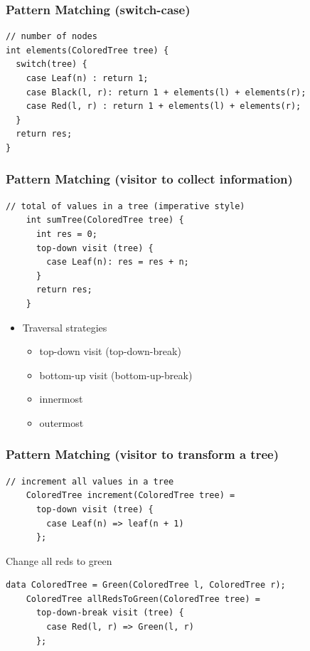 \documentclass{beamer}
\begin{document}
\begin{frame}[fragile]
  \frametitle{Pattern Matching (switch-case)}

    \begin{small}
      \begin{lstlisting}[language=Rascal]
// number of nodes  
int elements(ColoredTree tree) {
  switch(tree) {
    case Leaf(n) : return 1; 
    case Black(l, r): return 1 + elements(l) + elements(r);
    case Red(l, r) : return 1 + elements(l) + elements(r);
  }
  return res; 
} 
\end{lstlisting}
    \end{small}

  
\end{frame}

\begin{frame}[fragile]
  \frametitle{Pattern Matching (visitor to collect information)}

    \begin{small}
      \begin{lstlisting}[language=Rascal]
    // total of values in a tree (imperative style)     
    int sumTree(ColoredTree tree) {
      int res = 0;
      top-down visit (tree) {
        case Leaf(n): res = res + n;
      }
      return res;
    }
\end{lstlisting}
\end{small}

  \begin{itemize}
    \item Traversal strategies
      \begin{itemize}
        \item top-down visit (top-down-break)
        \item bottom-up visit (bottom-up-break)
        \item innermost
        \item outermost  
      \end{itemize}  
  \end{itemize}  
\end{frame}

\begin{frame}[fragile]
  \frametitle{Pattern Matching (visitor to transform a tree)}

  \begin{lstlisting}[language=Rascal]
    // increment all values in a tree 
    ColoredTree increment(ColoredTree tree) =
      top-down visit (tree) {
        case Leaf(n) => leaf(n + 1)
      };
    \end{lstlisting}  
  \pause

  \begin{block}{Change all reds to green}
    \begin{lstlisting}[language=Rascal]
    data ColoredTree = Green(ColoredTree l, ColoredTree r);   
    ColoredTree allRedsToGreen(ColoredTree tree) =
      top-down-break visit (tree) {
        case Red(l, r) => Green(l, r)
      };
    \end{lstlisting}  
  \end{block}
\end{frame}
\end{document}
